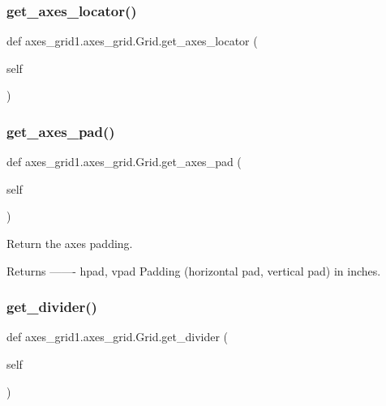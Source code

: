 \subsubsection{\texorpdfstring{get\+\_\+axes\+\_\+locator()}{get\_axes\_locator()}}
{\footnotesize\ttfamily def axes\+\_\+grid1.\+axes\+\_\+grid.\+Grid.\+get\+\_\+axes\+\_\+locator (\begin{DoxyParamCaption}\item[{}]{self }\end{DoxyParamCaption})}

\mbox{\label{classaxes__grid1_1_1axes__grid_1_1Grid_af68c980b4318ec453ca99d41eb8eb081}} 
\subsubsection{\texorpdfstring{get\+\_\+axes\+\_\+pad()}{get\_axes\_pad()}}
{\footnotesize\ttfamily def axes\+\_\+grid1.\+axes\+\_\+grid.\+Grid.\+get\+\_\+axes\+\_\+pad (\begin{DoxyParamCaption}\item[{}]{self }\end{DoxyParamCaption})}

\begin{DoxyVerb}Return the axes padding.

Returns
-------
hpad, vpad
    Padding (horizontal pad, vertical pad) in inches.
\end{DoxyVerb}
 \mbox{\label{classaxes__grid1_1_1axes__grid_1_1Grid_adb474c19f186cd685884ae1260ef0ab8}} 
\subsubsection{\texorpdfstring{get\+\_\+divider()}{get\_divider()}}
{\footnotesize\ttfamily def axes\+\_\+grid1.\+axes\+\_\+grid.\+Grid.\+get\+\_\+divider (\begin{DoxyParamCaption}\item[{}]{self }\end{DoxyParamCaption})}

